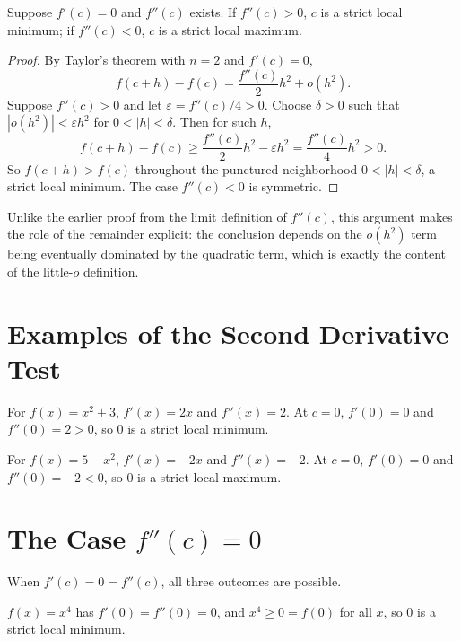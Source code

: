 \documentclass{essay}
\begin{document}
\begin{corollary}
Suppose \(f'(c)=0\) and \(f''(c)\) exists. If \(f''(c)>0\), \(c\) is a
strict local minimum; if \(f''(c)<0\), \(c\) is a strict local maximum.
\end{corollary}

\begin{proof}
By Taylor's theorem with \(n=2\) and \(f'(c)=0\),
\[
f(c+h)-f(c)=\frac{f''(c)}{2}h^2+o(h^2).
\]
Suppose \(f''(c)>0\) and let \(\varepsilon=f''(c)/4>0\). Choose \(\delta>0\)
such that \(|o(h^2)|<\varepsilon h^2\) for \(0<|h|<\delta\). Then for such
\(h\),
\[
f(c+h)-f(c) \geq \frac{f''(c)}{2}h^2-\varepsilon h^2 = \frac{f''(c)}{4}h^2>0.
\]
So \(f(c+h)>f(c)\) throughout the punctured neighborhood \(0<|h|<\delta\),
a strict local minimum. The case \(f''(c)<0\) is symmetric.
\end{proof}

Unlike the earlier proof from the limit definition of \(f''(c)\), this
argument makes the role of the remainder explicit: the conclusion depends
on the \(o(h^2)\) term being eventually dominated by the quadratic term,
which is exactly the content of the little-\(o\) definition.

\section{Examples of the Second Derivative Test}

\begin{example}
For \(f(x)=x^2+3\), \(f'(x)=2x\) and \(f''(x)=2\). At \(c=0\), \(f'(0)=0\)
and \(f''(0)=2>0\), so \(0\) is a strict local minimum.
\end{example}

\begin{example}
For \(f(x)=5-x^2\), \(f'(x)=-2x\) and \(f''(x)=-2\). At \(c=0\), \(f'(0)=0\)
and \(f''(0)=-2<0\), so \(0\) is a strict local maximum.
\end{example}

\section{The Case \texorpdfstring{\(f''(c)=0\)}{f''(c)=0}}

When \(f'(c)=0=f''(c)\), all three outcomes are possible.

\begin{example}
\(f(x)=x^4\) has \(f'(0)=f''(0)=0\), and \(x^4\geq0=f(0)\) for all \(x\), so
\(0\) is a strict local minimum.
\end{example}
\end{document}
